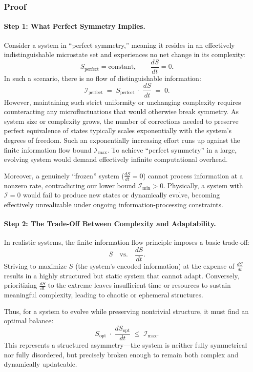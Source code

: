 \documentclass[12pt]{article}
\begin{document}
\subsubsection{Proof}
\paragraph{Step 1: What Perfect Symmetry Implies.}
Consider a system in ``perfect symmetry,'' meaning it resides in an effectively indistinguishable microstate set and experiences no net change in its complexity:
\[
   S_{\text{perfect}} = \text{constant}, 
   \qquad
   \frac{dS}{dt} = 0.
\]
In such a scenario, there is no flow of distinguishable information:
\[
   \mathcal{I}_{\text{perfect}}
   \;=\;
   S_{\text{perfect}} 
   \;\cdot\;
   \frac{dS}{dt}
   \;=\;
   0.
\]
However, maintaining such strict uniformity or unchanging complexity requires counteracting any microfluctuations that would otherwise break symmetry. As system size or complexity grows, the number of corrections needed to preserve perfect equivalence of states typically scales exponentially with the system's degrees of freedom. Such an exponentially increasing effort runs up against the finite information flow bound \(\mathcal{I}_{\max}\). To achieve ``perfect symmetry'' in a large, evolving system would demand effectively infinite computational overhead.

Moreover, a genuinely ``frozen'' system (\(\frac{dS}{dt}=0\)) cannot process information at a nonzero rate, contradicting our lower bound \(\mathcal{I}_{\min}>0\). Physically, a system with \(\mathcal{I}=0\) would fail to produce new states or dynamically evolve, becoming effectively unrealizable under ongoing information-processing constraints.

\paragraph{Step 2: The Trade-Off Between Complexity and Adaptability.}
In realistic systems, the finite information flow principle imposes a basic trade-off:
\[
   S \quad\text{vs.}\quad \frac{dS}{dt}.
\]
Striving to maximize \(S\) (the system's encoded information) at the expense of \(\frac{dS}{dt}\) results in a highly structured but static system that cannot adapt. Conversely, prioritizing \(\frac{dS}{dt}\) to the extreme leaves insufficient time or resources to sustain meaningful complexity, leading to chaotic or ephemeral structures.

Thus, for a system to evolve while preserving nontrivial structure, it must find an optimal balance:
\[
   S_{\text{opt}} \;\cdot\; \frac{dS_{\text{opt}}}{dt}
   \;\leq\;
   \mathcal{I}_{\max}.
\]
This represents a structured asymmetry---the system is neither fully symmetrical nor fully disordered, but precisely broken enough to remain both complex and dynamically updateable.
\end{document}
